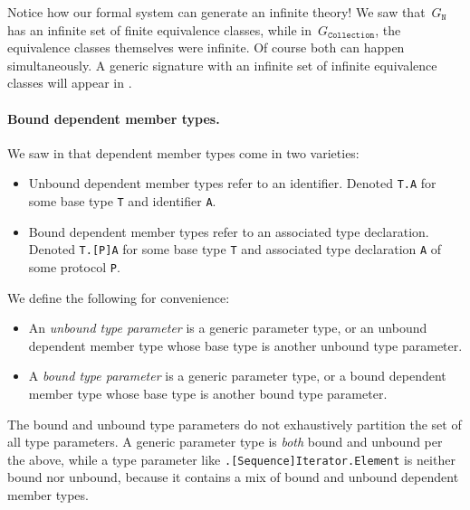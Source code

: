 \documentclass[../generics]{subfiles}
\begin{document}
Notice how our formal system can generate an infinite theory! We saw that~$G_\texttt{N}$ has an infinite set of finite equivalence classes, while in~$G_\texttt{Collection}$, the equivalence classes themselves were infinite. Of course both can happen simultaneously. A generic signature with an infinite set of infinite equivalence classes will appear in .

\paragraph{Bound dependent member types.}
We saw in  that dependent member types come in two varieties:
\begin{itemize}
\item {}Unbound dependent member types refer to an identifier. Denoted \texttt{T.A} for some base type \texttt{T} and identifier \texttt{A}.
\item {}Bound dependent member types refer to an associated type declaration. Denoted \texttt{T.[P]A} for some base type \texttt{T} and associated type declaration \texttt{A} of some protocol \texttt{P}.
\end{itemize}

\begin{definition}
We define the following for convenience:
\begin{itemize}
\item An \emph{unbound type parameter} is a generic parameter type, or an unbound dependent member type whose base type is another unbound type parameter.

\item A \emph{bound type parameter} is a generic parameter type, or a bound dependent member type whose base type is another bound type parameter.
\end{itemize}
The bound and unbound type parameters do not exhaustively partition the set of all type parameters. A generic parameter type is \emph{both} bound and unbound per the above, while a type parameter like \texttt{\rT.[Sequence]Iterator.Element} is neither bound nor unbound, because it contains a mix of bound and unbound dependent member types.
\end{definition}
\end{document}
